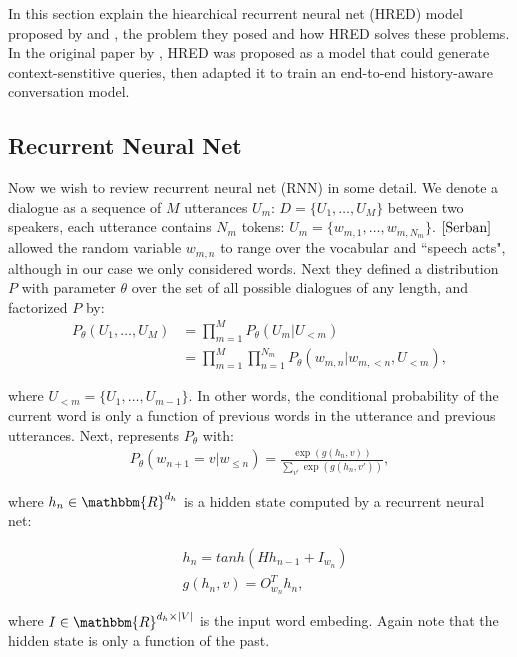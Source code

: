 In this section explain the hiearchical recurrent neural net (HRED) model proposed by \cite{Serban} and \cite{Sordoni}, the problem they posed and how HRED solves these problems. In the original paper by \cite{Sordoni}, HRED was proposed as a model that could generate context-senstitive queries, then \cite{Serban} adapted it to train an end-to-end history-aware conversation model.

\subsection{Recurrent Neural Net}

Now we wish to review recurrent neural net (RNN) in some detail. We denote a dialogue as a sequence of $M$ utterances $U_m$: $D = \{U_1, \ldots, U_M\}$ between two speakers, each utterance contains $N_m$ tokens: $U_m = \{w_{m,1},\ldots,w_{m,N_m}\}$. $\cite{Serban}$ allowed the random variable $w_{m,n}$ to range over the vocabular and ``speech acts", although in our case we only considered words. Next they defined a distribution $P$ with parameter $\theta$ over the set of all possible dialogues of any length, and factorized $P$ by:
    \begin{align*}
        P_{\theta}(U_1, \ldots, U_M) &= \prod_{m=1}^M P_{\theta}(U_m | U_{<m}) \\
                                     &= \prod_{m=1}^M \prod_{n=1}^{N_m} P_{\theta} (w_{m,n}|w_{m,<n}, U_{<m}),
    \end{align*}

where $U_{<m} = \{U_1, \ldots, U_{m-1}\}$. In other words, the conditional probability of the current word is only a function of previous words in the utterance and previous utterances. Next, \cite{Serban} represents $P_{\theta}$ with:
    \begin{align*}
        P_{\theta} (w_{n+1} = v | w_{\leq n}) = \frac{\exp(g(h_n,v))}{\sum_{v'} \exp(g(h_n, v'))},
    \end{align*}

where $h_n \in \mathbbm{R}^{d_h}$ is a hidden state computed by a recurrent neural net:

    \begin{align*}
        &h_n = tanh (H h_{n-1} + I_{w_n}) \\
        &g(h_n, v) = O^{T}_{w_n} h_n,
    \end{align*}

where $I \in \mathbbm{R}^{d_h \times |V|}$ is the input word embeding. Again note that the hidden state is only a function of the past. 

